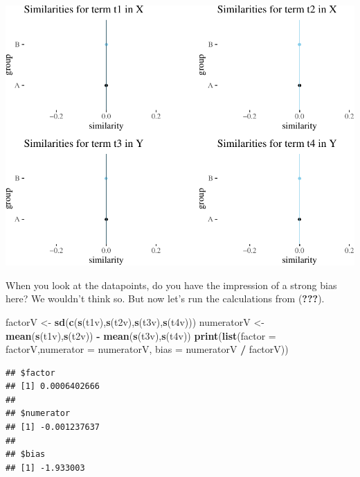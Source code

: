 \documentclass[10pt,dvipsnames,enabledeprecatedfontcommands]{scrartcl}
\newenvironment{Shaded}{\begin{snugshade}}{\end{snugshade}}
\newcommand{\KeywordTok}[1]{\textcolor[rgb]{0.13,0.29,0.53}{\textbf{#1}}}
\newcommand{\DataTypeTok}[1]{\textcolor[rgb]{0.13,0.29,0.53}{#1}}
\newcommand{\StringTok}[1]{\textcolor[rgb]{0.31,0.60,0.02}{#1}}
\newcommand{\OperatorTok}[1]{\textcolor[rgb]{0.81,0.36,0.00}{\textbf{#1}}}
\newcommand{\NormalTok}[1]{#1}
\begin{document}
\normalsize

\begin{center}\includegraphics[width=1\linewidth]{paperDraft_files/figure-latex/unnamed-chunk-6-1} \end{center}

\noindent When you look at the datapoints, do you have the impression of
a strong bias here? We wouldn't think so. But now let's run the
calculations from ({\textbf{???}}).

\vspace{1mm} \footnotesize

\begin{Shaded}
\begin{Highlighting}[]
\NormalTok{factorV <-}\StringTok{ }\KeywordTok{sd}\NormalTok{(}\KeywordTok{c}\NormalTok{(}\KeywordTok{s}\NormalTok{(t1v),}\KeywordTok{s}\NormalTok{(t2v),}\KeywordTok{s}\NormalTok{(t3v),}\KeywordTok{s}\NormalTok{(t4v)))}
\NormalTok{numeratorV <-}\StringTok{  }\KeywordTok{mean}\NormalTok{(}\KeywordTok{s}\NormalTok{(t1v),}\KeywordTok{s}\NormalTok{(t2v)) }\OperatorTok{-}\StringTok{ }\KeywordTok{mean}\NormalTok{(}\KeywordTok{s}\NormalTok{(t3v),}\KeywordTok{s}\NormalTok{(t4v))}
\KeywordTok{print}\NormalTok{(}\KeywordTok{list}\NormalTok{(}\DataTypeTok{factor =}\NormalTok{ factorV,}\DataTypeTok{numerator =}\NormalTok{ numeratorV, }\DataTypeTok{bias =}\NormalTok{ numeratorV }\OperatorTok{/}\StringTok{ }\NormalTok{factorV))}
\end{Highlighting}
\end{Shaded}

\begin{verbatim}
## $factor
## [1] 0.0006402666
## 
## $numerator
## [1] -0.001237637
## 
## $bias
## [1] -1.933003
\end{verbatim}
\end{document}
